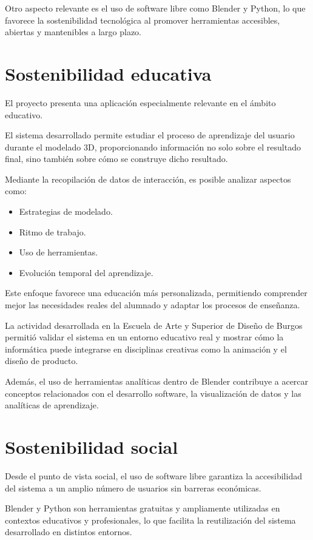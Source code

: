 Otro aspecto relevante es el uso de software libre como Blender y Python, lo que favorece la sostenibilidad tecnológica al promover herramientas accesibles, abiertas y mantenibles a largo plazo.

\section{Sostenibilidad educativa}

El proyecto presenta una aplicación especialmente relevante en el ámbito educativo.

El sistema desarrollado permite estudiar el proceso de aprendizaje del usuario durante el modelado 3D, proporcionando información no solo sobre el resultado final, sino también sobre cómo se construye dicho resultado.

Mediante la recopilación de datos de interacción, es posible analizar aspectos como:
\begin{itemize}
    \item Estrategias de modelado.
    \item Ritmo de trabajo.
    \item Uso de herramientas.
    \item Evolución temporal del aprendizaje.
\end{itemize}

Este enfoque favorece una educación más personalizada, permitiendo comprender mejor las necesidades reales del alumnado y adaptar los procesos de enseñanza.

La actividad desarrollada en la Escuela de Arte y Superior de Diseño de Burgos permitió validar el sistema en un entorno educativo real y mostrar cómo la informática puede integrarse en disciplinas creativas como la animación y el diseño de producto.

Además, el uso de herramientas analíticas dentro de Blender contribuye a acercar conceptos relacionados con el desarrollo software, la visualización de datos y las analíticas de aprendizaje.

\section{Sostenibilidad social}

Desde el punto de vista social, el uso de software libre garantiza la accesibilidad del sistema a un amplio número de usuarios sin barreras económicas.

Blender y Python son herramientas gratuitas y ampliamente utilizadas en contextos educativos y profesionales, lo que facilita la reutilización del sistema desarrollado en distintos entornos.

